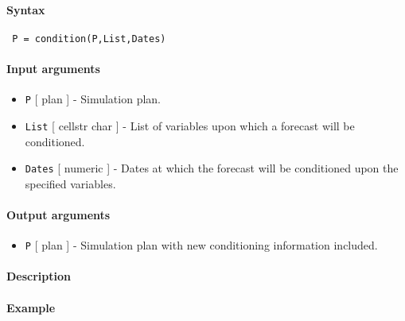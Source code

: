 


	\paragraph{Syntax}
 
 \begin{verbatim}
 P = condition(P,List,Dates)
 \end{verbatim}
 
 \paragraph{Input arguments}
 
 \begin{itemize}
 \item
   \texttt{P} {[} plan {]} - Simulation plan.
 \item
   \texttt{List} {[} cellstr \textbar{} char {]} - List of variables upon
   which a forecast will be conditioned.
 \item
   \texttt{Dates} {[} numeric {]} - Dates at which the forecast will be
   conditioned upon the specified variables.
 \end{itemize}
 
 \paragraph{Output arguments}
 
 \begin{itemize}
 \item
   \texttt{P} {[} plan {]} - Simulation plan with new conditioning
   information included.
 \end{itemize}
 
 \paragraph{Description}
 
 \paragraph{Example}


